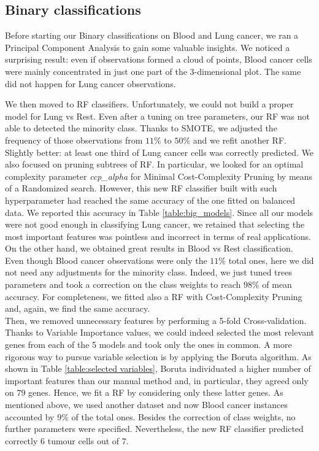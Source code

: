 \documentclass[a4paper,11pt, oneside]{article}  %
\begin{document}
\subsection{Binary classifications}
Before starting our Binary classifications on Blood and Lung cancer, we ran a Principal Component Analysis to gain some valuable insights. We noticed a surprising result: even if observations formed a cloud of points, Blood cancer cells were mainly concentrated in just one part of the 3-dimensional plot. The same did not happen for Lung cancer observations.

We then moved to RF classifiers. Unfortunately, we could not build a proper model for Lung vs Rest. Even after a tuning on tree parameters, our RF was not able to detected the minority class. Thanks to SMOTE, we adjusted the frequency of those observations from $11\%$ to $50\%$ and we refit another RF. Slightly better: at least one third of Lung cancer cells was correctly predicted. We also focused on pruning subtrees of RF. In particular, we looked for an optimal complexity parameter \textit{ccp\_alpha} for Minimal Cost-Complexity Pruning by means of a Randomized search. However, this new RF classifier built with such hyperparameter had reached the same accuracy of the one fitted on balanced data. We reported this accuracy in Table \ref{table:big_models}.
Since all our models were not good enough in classifying Lung cancer, we retained that selecting the most important features was pointless and incorrect in terms of real applications. \\
On the other hand, we obtained great results in Blood vs Rest classification. Even though Blood cancer observations were only the $11\%$ total ones, here we did not need any adjustments for the minority class. Indeed, we just tuned trees parameters and took a correction on the class weights to reach $98\%$ of mean accuracy. For completeness, we fitted also a RF with Cost-Complexity Pruning and, again, we find the same accuracy. \\
Then, we removed unnecessary features by performing a 5-fold Cross-validation. Thanks to Variable Importance values, we could indeed selected the most relevant genes from each of the 5 models and took only the ones in common. A more rigorous way to pursue variable selection is by applying the Boruta algorithm. As shown in Table \ref{table:selected variables}, Boruta individuated a higher number of important features than our manual method and, in particular, they agreed only on $79$ genes.
Hence, we fit a RF by considering only these latter genes. As mentioned above, we used another dataset and now Blood cancer instances accounted by $9\%$ of the total ones. Besides the correction of class weights, no further parameters were specified. Nevertheless, the new RF classifier predicted correctly $6$ tumour cells out of $7$.   
\end{document}
